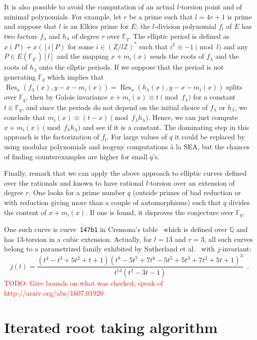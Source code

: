 \documentclass[12pt]{article}
\theoremstyle{plain}
\theoremstyle{definition}
\newcommand{\todo}[1]{\textcolor{red}{TODO: #1}}
\DeclareMathOperator{\Res}{Res}
\def\Q{\ensuremath{\mathbb{Q}}}
\def\Z{\ensuremath{\mathbb{Z}}}
\def\F{\ensuremath{\mathbb{F}}}
\newcounter{algorithm}
\begin{document}
It is also possible to avoid the computation of an actual $l$-torsion point
and of minimal polynomials.
For example, let $r$ be a prime such that $l = 4 r + 1$ is prime
and suppose that $l$ is an Elkies prime for $E$:
the $l$-division polynomial $f_l$ of $E$ has two factors
$f_\lambda$ and $h_\lambda$ of degree $r$ over $\F_{q}$.
The elliptic period is defined as $x(P) + x([i] P)$ for some
$i \in \left(Z / l \Z\right)^*$ such that $i^2 \equiv -1 \pmod{l}$
and any $P \in E(\F_{q^r})[l]$
and the mapping $x + m_i(x)$ sends the roots of $f_\lambda$
and the roots of $h_\lambda$ onto the ellptic periods.
If we suppose that the period is not generating $\F_{q}$ which implies that
$\Res_x(f_\lambda(x),y-x-m_i(x)) = \Res_x(h_\lambda(x),y-x-m_i(x))$
splits over $\F_{q}$,
then by Galois invariance $x + m_i(x) \equiv t \pmod{f_\lambda}$
for a constant $t \in \F_{q}$,
and since the periods do not depend on the initial choice of $f_\lambda$
or $h_\lambda$,
we conclude that $m_i(x) \equiv (t-x) \pmod{f_\lambda h_\lambda}$.
Hence, we can just compute $x + m_i(x) \pmod{f_\lambda h_\lambda}$
and see if it is a constant.
The dominating step in this approach is the factorization of $f_l$.
For large values of $q$ it could be replaced by using modular polynomials
and isogeny computations \`a la SEA, but the chances of finding counterexamples
are higher for small $q$'s.

Finally, remark that we can apply the above approach to elliptic curves
defined over the rationals and known to have rational $l$-torsion
over an extension of degree $r$.
One looks for a prime number $q$
(outside primes of bad reduction or
with reduction giving more than a couple of automorphisms)
such that $q$ divides the content of $x + m_i(x)$.
If one is found, it disproves the conjecture over $\F_q$.

One such curve is curve~\texttt{147b1} in Cremona's table~\cite{} which is
defined over $\Q$ and has $13$-torsion in a cubic extension.
Actually, for $l=13$ and $r=3$, all such curves belong to a parametrized family
exhibited by Sutherland et al.~\cite{} with $j$-invariant:
\[
j(t)=\frac{\left(t^4-t^3+5 t^2 + t + 1\right) \left(t^8 - 5 t^7 + 7 t^6 - 5 t^5 + 5 t^3 + 7 t^2 + 5 t + 1\right)^3}{t^{13} \left(t^2 -3 t - 1\right)} \enspace .
\]
\todo{Give bounds on what was checked, speak of http://arxiv.org/abs/1607.01920 }

\section{Iterated root taking algorithm}
\end{document}
